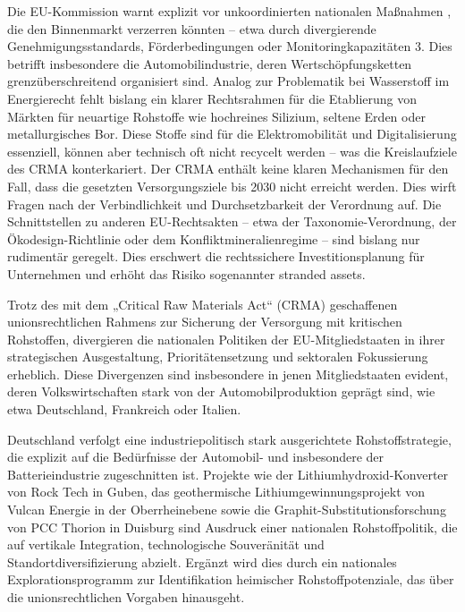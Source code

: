 \documentclass[12pt,a4paper,oneside]{book} %
\begin{document}
	Die EU-Kommission warnt explizit vor \glqq unkoordinierten nationalen Maßnahmen \grqq, die den Binnenmarkt verzerren könnten – etwa durch divergierende Genehmigungsstandards, Förderbedingungen oder Monitoringkapazitäten 3. Dies betrifft insbesondere die Automobilindustrie, deren Wertschöpfungsketten grenzüberschreitend organisiert sind. Analog zur Problematik bei Wasserstoff im Energierecht fehlt bislang ein klarer Rechtsrahmen für die Etablierung von Märkten für neuartige Rohstoffe wie hochreines Silizium, seltene Erden oder metallurgisches Bor. Diese Stoffe sind für die Elektromobilität und Digitalisierung essenziell, können aber technisch oft nicht recycelt werden – was die Kreislaufziele des CRMA konterkariert. Der CRMA enthält keine klaren Mechanismen für den Fall, dass die gesetzten Versorgungsziele bis 2030 nicht erreicht werden. Dies wirft Fragen nach der Verbindlichkeit und Durchsetzbarkeit der Verordnung auf. Die Schnittstellen zu anderen EU-Rechtsakten – etwa der Taxonomie-Verordnung, der Ökodesign-Richtlinie oder dem Konfliktmineralienregime – sind bislang nur rudimentär geregelt. Dies erschwert die rechtssichere Investitionsplanung für Unternehmen und erhöht das Risiko sogenannter \glqq stranded assets\grqq.
	

	
Trotz des mit dem „Critical Raw Materials Act“ (CRMA) geschaffenen unionsrechtlichen Rahmens zur Sicherung der Versorgung mit kritischen Rohstoffen, divergieren die nationalen Politiken der EU-Mitgliedstaaten in ihrer strategischen Ausgestaltung, Prioritätensetzung und sektoralen Fokussierung erheblich. Diese Divergenzen sind insbesondere in jenen Mitgliedstaaten evident, deren Volkswirtschaften stark von der Automobilproduktion geprägt sind, wie etwa Deutschland, Frankreich oder Italien.

Deutschland verfolgt eine industriepolitisch stark ausgerichtete Rohstoffstrategie, die explizit auf die Bedürfnisse der Automobil- und insbesondere der Batterieindustrie zugeschnitten ist. Projekte wie der Lithiumhydroxid-Konverter von Rock Tech in Guben, das geothermische Lithiumgewinnungsprojekt von Vulcan Energie in der Oberrheinebene sowie die Graphit-Substitutionsforschung von PCC Thorion in Duisburg sind Ausdruck einer nationalen Rohstoffpolitik, die auf vertikale Integration, technologische Souveränität und Standortdiversifizierung abzielt. Ergänzt wird dies durch ein nationales Explorationsprogramm zur Identifikation heimischer Rohstoffpotenziale, das über die unionsrechtlichen Vorgaben hinausgeht.
\end{document}
